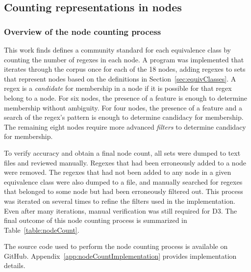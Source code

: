 \subsection{Counting representations in nodes}

\subsubsection{Overview of the node counting process}
\label{sec:nodeCountOverview}
This work finds defines a community standard for each equivalence class by counting the number of regexes in each node.  A program was implemented that iterates through the corpus once for each of the 18 nodes, adding regexes to sets that represent nodes based on the definitions in Section~\ref{sec:equivClasses}.  A regex is a \emph{candidate} for membership in a node if it is possible for that regex belong to a node.  For six nodes, the presence of a feature is enough to determine membership without ambiguity.  For four nodes, the presence of a feature and a search of the regex's pattern is enough to determine candidacy for membership.  The remaining eight nodes require more advanced \emph{filters} to determine candidacy for membership.

To verify accuracy and obtain a final node count, all sets were dumped to text files and reviewed manually. Regexes that had been erroneously added to a node were removed.  The regexes that had not been added to any node in a given equivalence class were also dumped to a file, and manually searched for regexes that belonged to some node but had been erroneously filtered out.  This process was iterated on several times to refine the filters used in the implementation.  Even after many iterations, manual verification was still required for D3. The final outcome of this node counting process is summarized in Table~\ref{table:nodeCount}.

The source code used to perform the node counting process is available on GitHub.  Appendix~\ref{app:nodeCountImplementation} provides implementation details.
